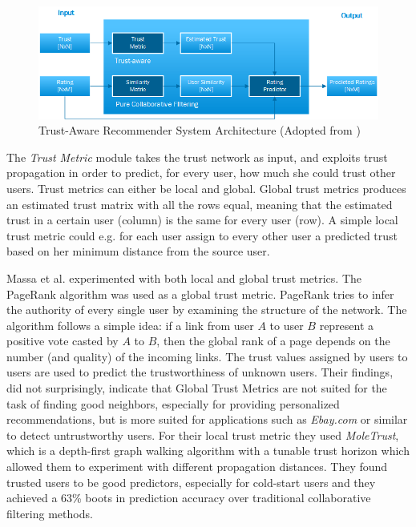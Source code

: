 \begin{figure}[H]
    \includegraphics[width=5in]{image/trustawarearchitecture.png}
    \centering
    \caption[Trust-Aware Recommender System Architecture]{Trust-Aware
    Recommender System Architecture (Adopted from \cite{Massa2004})}
    \label{figure:trustarchictecture}
\end{figure}

The \emph{Trust Metric} module takes the trust network as input, and exploits
trust propagation in order to predict, for every user, how much she could trust
other users. Trust metrics can either be local and global. Global trust metrics
produces an estimated trust matrix with all the rows equal, meaning that the
estimated trust in a certain user (column) is the same for every user (row). A
simple local trust metric could e.g. for each user assign to every other user a
predicted trust based on her minimum distance from the source user.

Massa et al. \cite{Massa2007} experimented with both local and global trust
metrics. The PageRank algorithm was used as a global trust metric. PageRank
tries to infer the authority of every single user by examining the structure of
the network. The algorithm follows a simple idea: if a link from user $A$ to
user $B$ represent a positive vote casted by $A$ to $B$, then the global rank
of a page depends on the number (and quality) of the incoming links. The trust
values assigned by users to users are used to predict the trustworthiness of
unknown users. Their findings, did not surprisingly, indicate that Global Trust
Metrics are not suited for the task of finding good neighbors, especially for
providing personalized recommendations, but is more suited for applications such
as \emph{Ebay.com} or similar to detect untrustworthy users. For their local trust metric
they used \emph{MoleTrust}, which is a depth-first graph walking algorithm with a tunable
trust horizon which allowed them to experiment with different propagation
distances. They found trusted users to be good predictors, especially for cold-start
users and they achieved a 63\% boots in prediction accuracy over traditional collaborative filtering
methods.


